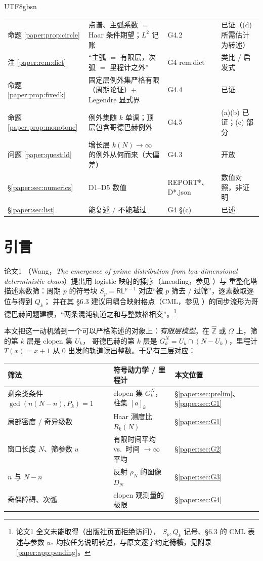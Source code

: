 \documentclass[11pt,a4paper]{article}
\newcommand{\Zhat}{\widehat{\mathbb Z}}
\newcommand{\Lsym}{\ensuremath{\mathsf{L}}}
\newcommand{\Rsym}{\ensuremath{\mathsf{R}}}
\newcommand{\Om}{\Omega}               %
\newcommand{\cyl}[2]{[#1]_{#2}}        %
\newcommand{\ust}{u_{*}}               %
\theoremstyle{plain}
\theoremstyle{definition}
\begin{document}
\begin{CJK}{UTF8}{gbsn}
\begin{center}
\begin{tabular}{p{1.5cm}p{6.6cm}p{2.3cm}p{4.0cm}}
命题 \ref{paper:prop:circle} & 点谱、主弧系数 $=$ Haar 条件期望；$L^2$ 记账 & G4.2 & 已证（(d) 所需估计为转述）\\
注 \ref{paper:rem:dict} & “主弧 $=$ 有限层，次弧 $=$ 里程计之外” & G4 rem:dict & 类比 / 启发式\\
命题 \ref{paper:prop:fixedk} & 固定层例外集严格有限（周期论证）$+$ Legendre 显式界 & G4.4 & 已证\\
命题 \ref{paper:prop:monotone} & 例外集随 $k$ 单调；顶层包含哥德巴赫例外 & G4.5 & (a)(b) 已证；(c) 部分\\
问题 \ref{paper:quest:ld} & 增长层 $k(N)\to\infty$ 的例外从何而来（大偏差） & G4.3 & 开放\\
\S\ref{paper:sec:numerics} & D1--D5 数值 & REPORT*、D*.json & 数值对照，非证明\\
\S\ref{paper:sec:list} & 能复述 / 不能越过 & G4 \S(c) & 已述\\
\hline
\end{tabular}
\end{center}

\section{引言}\label{paper:sec:intro}

论文1 \cite{Wang26}（Wang，\emph{The emergence of prime distribution from low-dimensional deterministic chaos}）提出用 logistic 映射的揉序（kneading，参见 \cite{MSS73}）与
重整化塔描述素数筛：周期 $p$ 的符号块 $S_p=\Rsym\Lsym^{p-1}$ 对应“被 $p$ 筛去 / 过筛”，逐素数取逐位与得到 $Q_k$；
并在其 \S6.3 建议用耦合映射格点（CML，参见 \cite{Kan84}）的同步流形为哥德巴赫问题建模，“两条混沌轨道之和与整数格相交”。\footnote{论文1 全文未能取得（出版社页面拒绝访问），
$S_p,Q_k$ 记号、\S6.3 的 CML 表述与参数 $\ust$ 均按任务说明转述，与原文逐字约定\textbf{待核}，见附录 \ref{paper:app:pending}。}

本文把这一动机落到一个可以严格陈述的对象上：\emph{有限层模型}。在 $\Zhat$ 或 $\Om$ 上，筛的第 $k$ 层是 clopen 集 $U_k$，
哥德巴赫的第 $k$ 层是 $G_k^N=U_k\cap(N-U_k)$，里程计 $T(x)=x+1$ 从 $0$ 出发的轨道读出整数。于是有三层对应：
\begin{center}
\begin{tabular}{p{4.2cm}p{4.8cm}p{5.4cm}}
\hline
筛法 & 符号动力学 / 里程计 & 本文位置\\
\hline
剩余类条件 $\gcd(n(N-n),P_k)=1$ & clopen 集 $G_k^N$，柱集 $\cyl ak$ & \S\ref{paper:sec:prelim}、\S\ref{paper:sec:G1}\\
局部密度 / 奇异级数 & Haar 测度比 $R_k(N)$ & \S\ref{paper:sec:G1}\\
窗口长度 $N$、筛参数 $u$ & 有限时间平均 vs.\ 时间 $\to\infty$ 平均 & \S\ref{paper:sec:G2}\\
$n$ 与 $N-n$ & 反射 $\rho_N$ 的图像 $D_N$ & \S\ref{paper:sec:G3}\\
奇偶障碍、次弧 & clopen 观测量的极限 & \S\ref{paper:sec:G4}\\
\hline
\end{tabular}
\end{center}


\end{CJK}
\end{document}
